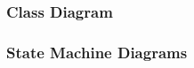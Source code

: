\documentclass{article}
\begin{document}
		\subsubsection{Class Diagram}
		\begin{minipage}{\linewidth}
			\vspace*{1cm}
		\end{minipage}
		\pagebreak
		\subsubsection{State Machine Diagrams}
		
\end{document}
